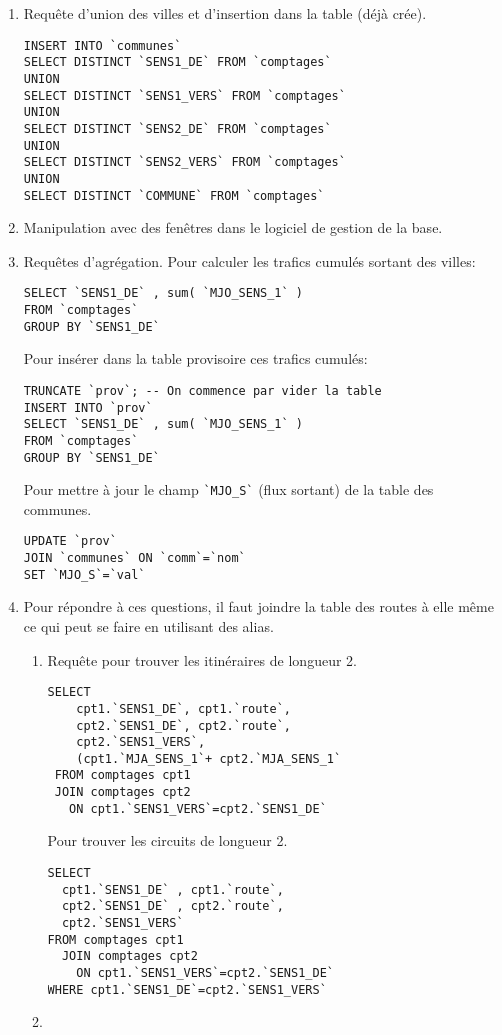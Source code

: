 \begin{enumerate}
  \item Requête d'union des villes et d'insertion dans la table (déjà crée).
\begin{verbatim}
INSERT INTO `communes`
SELECT DISTINCT `SENS1_DE` FROM `comptages`
UNION
SELECT DISTINCT `SENS1_VERS` FROM `comptages`
UNION
SELECT DISTINCT `SENS2_DE` FROM `comptages`
UNION
SELECT DISTINCT `SENS2_VERS` FROM `comptages`
UNION
SELECT DISTINCT `COMMUNE` FROM `comptages`  
\end{verbatim}
\item Manipulation avec des fenêtres dans le logiciel de gestion de la base.
\item Requêtes d'agrégation. Pour calculer les trafics cumulés sortant des villes:
\begin{verbatim}
SELECT `SENS1_DE` , sum( `MJO_SENS_1` )
FROM `comptages`
GROUP BY `SENS1_DE` 
\end{verbatim}
Pour insérer dans la table provisoire ces trafics cumulés:
\begin{verbatim}
TRUNCATE `prov`; -- On commence par vider la table
INSERT INTO `prov` 
SELECT `SENS1_DE` , sum( `MJO_SENS_1` )
FROM `comptages`
GROUP BY `SENS1_DE` 
\end{verbatim}
Pour mettre à jour le champ \verb|`MJO_S`| (flux sortant) de la table des communes.
\begin{verbatim}
UPDATE `prov` 
JOIN `communes` ON `comm`=`nom`
SET `MJO_S`=`val`
\end{verbatim}

\item Pour répondre à ces questions, il faut joindre la table des routes à elle même ce qui peut se faire en utilisant des alias. 
\begin{enumerate}
  \item Requête pour trouver les itinéraires de longueur 2.
\begin{verbatim}
SELECT 
    cpt1.`SENS1_DE`, cpt1.`route`,
    cpt2.`SENS1_DE`, cpt2.`route`,
    cpt2.`SENS1_VERS`,
    (cpt1.`MJA_SENS_1`+ cpt2.`MJA_SENS_1`
 FROM comptages cpt1 
 JOIN comptages cpt2 
   ON cpt1.`SENS1_VERS`=cpt2.`SENS1_DE`
\end{verbatim}
Pour trouver les circuits de longueur 2.
\begin{verbatim}
SELECT 
  cpt1.`SENS1_DE` , cpt1.`route`,
  cpt2.`SENS1_DE` , cpt2.`route`,
  cpt2.`SENS1_VERS` 
FROM comptages cpt1 
  JOIN comptages cpt2 
    ON cpt1.`SENS1_VERS`=cpt2.`SENS1_DE` 
WHERE cpt1.`SENS1_DE`=cpt2.`SENS1_VERS`  
\end{verbatim}

  \item 
\end{enumerate}

\end{enumerate}
